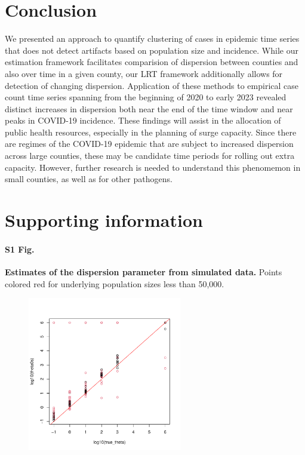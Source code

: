 \documentclass[10pt,letterpaper]{article}
\begin{document}
\section*{Conclusion}
We presented an approach to quantify clustering of cases in epidemic time series that does not detect artifacts based on population size and incidence. 
While our estimation framework facilitates comparision of dispersion between counties and also over time in a given county, our LRT framework additionally allows for detection of changing dispersion. 
Application of these methods to empirical case count time series spanning from the beginning of 2020 to early 2023 revealed distinct increases in dispersion both near the end of the time window and near peaks in COVID-19 incidence. 
These findings will assist in the allocation of public health resources, especially in the planning of surge capacity. Since there are regimes of the COVID-19 epidemic that are subject to increased dispersion across large counties, these may be candidate time periods for rolling out extra capacity. However, further research is needed to understand this phenomemon in small counties, as well as for other pathogens.

\section*{Supporting information}

\paragraph*{S1 Fig.}
\label{S1_Fig}
{\bf Estimates of the dispersion parameter from simulated data.} Points colored red for underlying population sizes less than 50,000.
\begin{figure}[!h]
\includegraphics[width=0.6\textwidth]{thetaest_v_theta.pdf}
\label{S1}
\end{figure}
\end{document}
